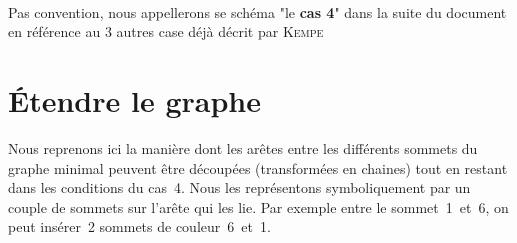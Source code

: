 \\
Pas convention, nous appellerons se schéma "le \textbf{cas 4}" dans la suite du document en référence au 3 autres case déjà décrit par \textsc{Kempe}\\
\FloatBarrier

%
%

\section{Étendre le graphe}
Nous reprenons ici la manière dont les arêtes entre les différents sommets du graphe minimal peuvent être découpées (transformées en chaines) tout en restant dans les conditions du cas~4. Nous les représentons symboliquement par un couple de sommets sur l’arête qui les lie. Par exemple entre le sommet~1~et~6, on peut insérer~2 sommets de couleur~6~et~1. 
